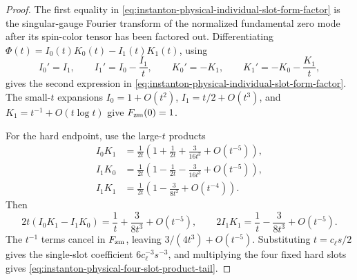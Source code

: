 \begin{proof}
The first equality in
\eqref{eq:instanton-physical-individual-slot-form-factor} is the
singular-gauge Fourier transform of the normalized fundamental zero mode
after its spin-color tensor has been factored out.  Differentiating
\(\Phi(t)=I_0(t)K_0(t)-I_1(t)K_1(t)\), using
\[
  I_0'=I_1,\qquad
  I_1'=I_0-\frac{I_1}{t},\qquad
  K_0'=-K_1,\qquad
  K_1'=-K_0-\frac{K_1}{t},
\]
gives the second expression in
\eqref{eq:instanton-physical-individual-slot-form-factor}.  The small-\(t\)
expansions \(I_0=1+O(t^2)\), \(I_1=t/2+O(t^3)\), and
\(K_1=t^{-1}+O(t\log t)\) give \(F_{\rm zm}(0)=1\).

For the hard endpoint, use the large-\(t\) products
\[
\begin{aligned}
  I_0K_1
  &=
  \frac1{2t}
  \left(1+\frac1{2t}+\frac{3}{16t^3}+O(t^{-5})\right),\\
  I_1K_0
  &=
  \frac1{2t}
  \left(1-\frac1{2t}-\frac{3}{16t^3}+O(t^{-5})\right),\\
  I_1K_1
  &=
  \frac1{2t}
  \left(1-\frac{3}{8t^2}+O(t^{-4})\right).
\end{aligned}
\]
Then
\[
  2t(I_0K_1-I_1K_0)
  =
  \frac1t+\frac{3}{8t^3}+O(t^{-5}),
  \qquad
  2I_1K_1
  =
  \frac1t-\frac{3}{8t^3}+O(t^{-5}).
\]
The \(t^{-1}\) terms cancel in \(F_{\rm zm}\), leaving
\(3/(4t^3)+O(t^{-5})\).  Substituting \(t=c_\ell s/2\) gives the
single-slot coefficient \(6c_\ell^{-3}s^{-3}\), and multiplying the four
fixed hard slots gives
\eqref{eq:instanton-physical-four-slot-product-tail}.
\end{proof}

